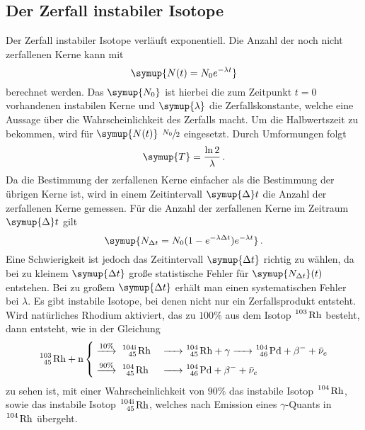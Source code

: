 \subsection{Der Zerfall instabiler Isotope}
Der Zerfall instabiler Isotope verläuft exponentiell. Die Anzahl der noch nicht zerfallenen Kerne kann mit 
\begin{equation}
    \symup{N(t)=N_0 e^{- \lambda t}}
    \label{eqn:isotope}
\end{equation}
berechnet werden. Das $\symup{N_0}$ ist hierbei die zum Zeitpunkt $t=0$ vorhandenen instabilen Kerne und $\symup{\lambda}$ die Zerfallskonstante, welche eine Aussage über die Wahrscheinlichkeit des Zerfalls macht.
Um die Halbwertszeit zu bekommen, wird für $\symup{N(t)}$ $\sfrac{N_0}{2}$ eingesetzt. Durch Umformungen folgt
\begin{equation}
    \symup{T}=\frac{\ln{2}}{\lambda} \, .
    \label{eqn:halbw}
\end{equation}
Da die Bestimmung der zerfallenen Kerne einfacher als die Bestimmung der übrigen Kerne ist, wird in einem Zeitintervall $\symup{\Delta}t$
die Anzahl der zerfallenen Kerne gemessen. Für die Anzahl der zerfallenen Kerne im Zeitraum $\symup{\Delta}t$ gilt
\begin{equation}
    \symup{N_{\Delta t}=N_0(1-e^{-\lambda \Delta t})e^{-\lambda t}} \, .
    \label{eqn:penis}
\end{equation}
Eine Schwierigkeit ist jedoch das Zeitintervall $\symup{\Delta t}$ richtig zu wählen, da
bei zu kleinem $\symup{\Delta t}$ große statistische Fehler für $\symup{N_{\Delta t}}(t)$ entstehen.
Bei zu großem $\symup{\Delta t}$ erhält man einen systematischen Fehler bei $\lambda$. 
Es gibt instabile Isotope, bei denen nicht nur ein Zerfallsprodukt entsteht.
Wird natürliches Rhodium aktiviert, das zu $100\%$ aus dem Isotop $\ce{^103 Rh}$ besteht, dann entsteht, wie in der Gleichung
\begin{equation}
   \ce{^103_45 Rh + n } 
    \begin{dcases}
        \stackrel{10\%}{\ce{->}}\ce{ ^{104\text{i}}_45 Rh &-> ^104_45 Rh + $\gamma$ -> ^104_46 Pd + $\beta$- + $\bar{\nu}_e$}  \\
        \stackrel{90\%}{\ce{->}}\ce{ ^104_45 Rh  &-> ^104_46 Pd + $\beta$- + $\bar{\nu}_e$} 
    \end{dcases}
\end{equation}
zu sehen ist, mit einer Wahrscheinlichkeit von $90\%$ das instabile Isotop $\ce{^104 Rh}$, sowie das instabile Isotop $\ce{^{104\text{i}}_45 Rh}$, welches nach Emission eines $\gamma$-Quants in $\ce{^104 Rh}$ übergeht.

